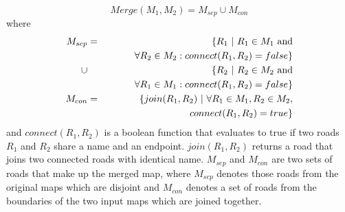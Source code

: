 \[
Merge(M_1, M_2) = M_{sep} \cup M_{con}
\]
where
\begin{eqnarray*}
M_{sep} &=& \{ R_1 ~|~ R_1 \in M_1~ {\rm and} \\
&& \hspace*{1cm} \forall R_2 \in M_2: connect(R_1, R_2) = false \} \\ 
\cup && \{ R_2 ~|~ R_2 \in M_2~ {\rm and}\\
&& \hspace*{1cm} \forall R_1 \in M_1: connect(R_1, R_2) = false \} \\
M_{con} &=& \{join(R_1, R_2) ~|~ \forall R_1 \in M_1, R_2 \in M_2, \\
&& \hspace*{1cm} connect(R_1, R_2) = true \} \\
\end{eqnarray*}
and $connect(R_1, R_2)$ is a boolean function that evaluates to true if
two roads $R_1$ and $R_2$ share a name and an endpoint. 
$join(R_1, R_2)$ returns a road that joins two connected roads with identical
name. 
$M_{sep}$ and $M_{con}$ are two sets of roads that make up the merged map,
where $M_{sep}$ denotes those roads from the original maps which are disjoint
and $M_{con}$ denotes a set of roads from the boundaries of the two input maps
which are joined together. 
%
%

